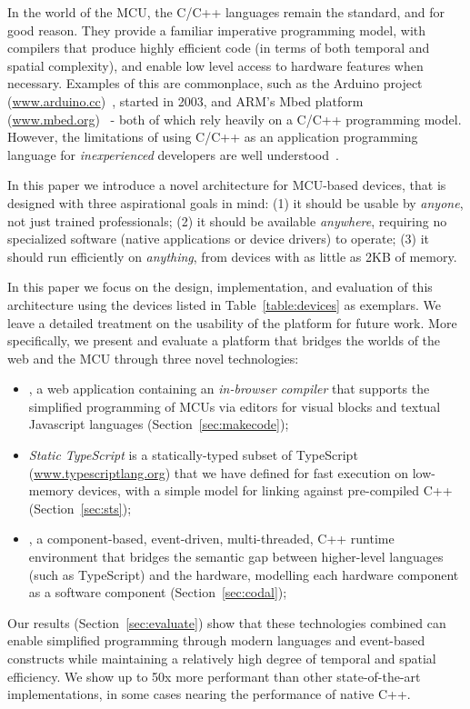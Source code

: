 In the world of the MCU, the C/C++ languages remain the standard, and for good reason.
They provide a familiar imperative programming model, with compilers that produce highly efficient code (in terms of both
temporal and spatial complexity), and enable low level access to hardware features when necessary. Examples
of this are commonplace, such as the Arduino project (\url{www.arduino.cc})~\cite{buildingArduino2014},
started in 2003, and ARM's Mbed platform (\url{www.mbed.org})~\cite{ARMmbed} - both of which rely heavily on
a C/C++ programming model. However, the limitations of using C/C++ as an application programming language for
\emph{inexperienced} developers are well understood~\cite{blikstein2013gears}.

In this paper we introduce a novel architecture for MCU-based devices,
that is designed with three aspirational goals in mind:
(1) it should be usable by \emph{anyone}, not just trained professionals;
(2) it should be available \emph{anywhere}, requiring no specialized software (native applications
or device drivers) to operate;
(3) it should run efficiently on \emph{anything}, from devices with as little as 2KB of memory.

In this paper we focus on the design, implementation, and evaluation of this architecture using the devices listed in Table~\ref{table:devices} as exemplars. We leave a detailed treatment on the usability of the platform for future work. More specifically, we present and evaluate a platform that bridges the worlds of the web and the
MCU through three novel technologies:

\begin{itemize}
\item \emph{\MCN}, a web application containing an \emph{in-browser compiler} that supports the
simplified programming of MCUs via editors for visual blocks and textual Javascript languages
(Section~\ref{sec:makecode});

\item \emph{Static TypeScript} is a statically-typed subset of TypeScript
(\url{www.typescriptlang.org}) that we have defined for fast execution on low-memory devices,
with a simple model for linking against pre-compiled C++ (Section~\ref{sec:sts});

\item \emph{\CO}, a component-based, event-driven, multi-threaded, C++ runtime environment
that bridges the semantic gap between higher-level languages (such as TypeScript) and the hardware,
modelling each hardware component as a software component (Section~\ref{sec:codal});
\end{itemize}
Our results (Section~\ref{sec:evaluate}) show that these technologies combined can enable simplified programming through modern
languages and event-based constructs while maintaining a relatively high degree of temporal and spatial efficiency.
We show up to 50x more performant than other state-of-the-art implementations,
in some cases nearing the performance of native C++.


